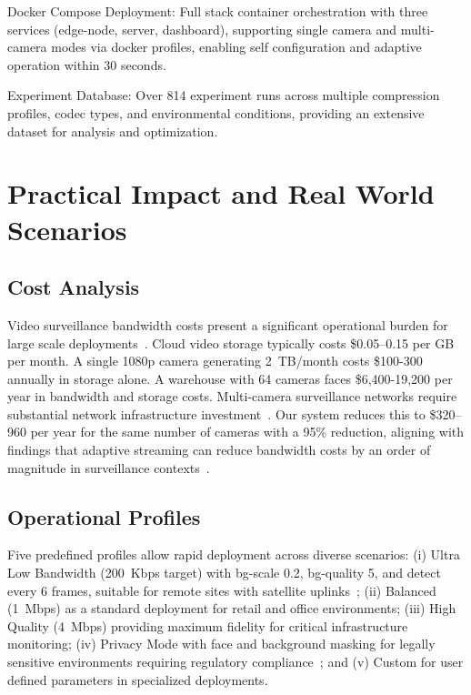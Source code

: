 \documentclass[11pt,a4paper]{article}
\begin{document}
Docker Compose Deployment: Full stack container orchestration with three services (edge-node, server, dashboard), supporting single camera and multi-camera modes via docker profiles, enabling self configuration and adaptive operation within 30 seconds.

Experiment Database: Over 814 experiment runs across multiple compression profiles, codec types, and environmental conditions, providing an extensive dataset for analysis and optimization.

\section{Practical Impact and Real World Scenarios}

\subsection{Cost Analysis}
Video surveillance bandwidth costs present a significant operational burden for large scale deployments~\cite{ahmad2024bandwidth}. Cloud video storage typically costs \$0.05--0.15 per GB per month. A single 1080p camera generating 2~TB/month costs \$100-300 annually in storage alone. A warehouse with 64 cameras faces \$6,400-19,200 per year in bandwidth and storage costs. Multi-camera surveillance networks require substantial network infrastructure investment~\cite{islam2024sdn}. Our system reduces this to \$320--960 per year for the same number of cameras with a 95\% reduction, aligning with findings that adaptive streaming can reduce bandwidth costs by an order of magnitude in surveillance contexts~\cite{guo2023deepstream}.

\subsection{Operational Profiles}
Five predefined profiles allow rapid deployment across diverse scenarios: (i) Ultra Low Bandwidth (200~Kbps target) with bg-scale 0.2, bg-quality 5, and detect every 6 frames, suitable for remote sites with satellite uplinks~\cite{liu2025edge}; (ii) Balanced (1~Mbps) as a standard deployment for retail and office environments; (iii) High Quality (4~Mbps) providing maximum fidelity for critical infrastructure monitoring; (iv) Privacy Mode with face and background masking for legally sensitive environments requiring regulatory compliance~\cite{kim2024privacy}; and (v) Custom for user defined parameters in specialized deployments.
\end{document}
